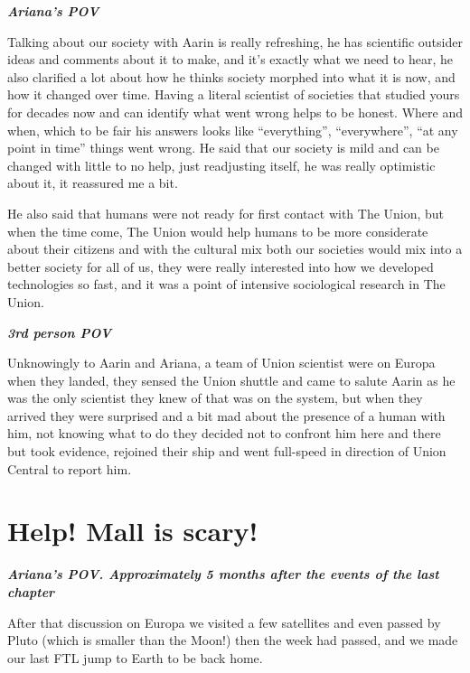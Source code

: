 \documentclass[colorlinks,12pt,a4paper]{book}
\begin{document}
\textit{\textbf{Ariana's POV}}\par
\bigskip

Talking about our society with Aarin is really refreshing, he has scientific outsider ideas and comments about 
it to make, and it's exactly what we need to hear, he also clarified a lot about how he thinks society morphed into
 what it is now, and how it changed over time. Having a literal scientist of societies that studied yours
  for decades now and can identify what went wrong helps to be honest. Where and when, which to be fair his answers looks like “everything”,
  “everywhere”, “at any point in time” things went wrong. He said that our society is mild and can be changed with little to no help,
   just readjusting itself, he was really optimistic about it, it reassured me a bit.\par
   \bigskip

He also said that humans were not ready for first contact with The Union, but when the time come, 
The Union would help humans to be more considerate about their citizens and with the cultural mix both our societies 
would mix into a better society for all of us, they were really interested into how we developed technologies so fast,
 and it was a point of intensive sociological research in The Union.\par
 \bigskip

\textit{\textbf{3rd person POV}}\par
\bigskip

Unknowingly to Aarin and Ariana, a team of Union scientist were on Europa when they landed,
 they sensed the Union shuttle and came to salute Aarin as he was the only scientist they knew of that was on the system, 
 but when they arrived they were surprised and a bit mad about the presence of a human with him, 
 not knowing what to do they decided not to confront him here and there but took evidence, rejoined their ship and 
 went full-speed in direction of Union Central to report him.\par
 \bigskip

 \chapter{Help! Mall is scary!}


 \textit{\textbf{Ariana's POV. Approximately 5 months after the events of the last chapter}}\par
 \bigskip
 
 After that discussion on Europa we visited a few satellites and even passed by Pluto (which is smaller than the Moon!) 
 then the week had passed, and we made our last FTL jump to Earth to be back home.\par
 \bigskip
 
\end{document}
